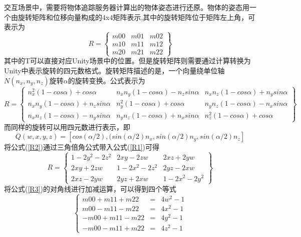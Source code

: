 交互场景中，需要将物体追踪服务器计算出的物体姿态进行还原。物体的姿态用一个由旋转矩阵和位移向量构成的4x4矩阵表示,其中的旋转矩阵位于矩阵左上角，可表示为
\begin{equation} 
R = 
 \begin{Bmatrix}
   m00 & m01 & m02 \\
   m10 & m11 & m12 \\
   m20 & m21 & m22  
  \end{Bmatrix}
\end{equation} 
  其中的T可以直接对应Unity场景中的位置。但是旋转矩阵则需要通过计算转换为Unity中表示旋转的四元数格式。旋转矩阵描述的是，一个向量绕单位轴$N(n_x, n_y, n_z)$旋转$\alpha$的旋转变换。公式表示为
  \begin{equation}\label{R1}
 R = 
  \begin{Bmatrix}
   n_x^2(1-cos\alpha)+cos\alpha & n_x n_y(1-cos\alpha) - n_zsin\alpha & n_x n_z(1-cos\alpha) + n_ysin\alpha \\
   n_x n_y(1-cos\alpha) + n_zsin\alpha & n_y^2(1-cos\alpha) + cos\alpha & n_y n_z(1-cos\alpha) - n_xsin\alpha \\
   n_x n_z(1-cos\alpha) - n_ysin\alpha & n_y n_z(1-cos\alpha) + n_xsin\alpha & n_z^2(1-cos\alpha) + cos\alpha 
  \end{Bmatrix}
\end{equation}
而同样的旋转可以用四元数进行表示，即
  \begin{equation}\label{R2}
Q(w, x, y, z) = [cos(\alpha/2), (sin(\alpha/2)n_x, sin(\alpha/2)n_y, sin(\alpha/2)n_z]
\end{equation}
将公式(\ref{R2})通过三角倍角公式带入公式(\ref{R1})可得
  \begin{equation}\label{R3}
 R = 
  \begin{Bmatrix}
   1-2y^2-2z^2 & 2xy-2zw & 2xz+2yw \\
   2xy+2zw & 1-2x^2-2z^2 & 2yz - 2xw \\
   2xz - 2yw & 2yz + 2xw & 1-2x^2-2y^2
  \end{Bmatrix}
\end{equation}
将公式(\ref{R3})的对角线进行加减运算，可以得到四个等式
\begin{equation}\label{R4}
\left\{
\begin{aligned}
m00 + m11 + m22 &=& 4w^2 - 1 \\
m00 - m11 - m22 &=& 4x^2 - 1 \\
-m00 + m11 - m22 &=& 4y^2 - 1 \\
-m00 - m11 + m22 &=& 4z^2 - 1 
\end{aligned}
\right.
\end{equation}
